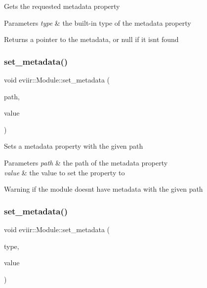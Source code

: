 Gets the requested metadata property 
\begin{DoxyParams}{Parameters}
{\em type} & the built-\/in type of the metadata property \\
\hline
\end{DoxyParams}
\begin{DoxyReturn}{Returns}
a pointer to the metadata, or null if it isn\textquotesingle{}t found 
\end{DoxyReturn}
\mbox{\label{classeviir_1_1Module_ad074a2b8807d4d4e2aeefa4c09756a07}} 
\subsubsection{\texorpdfstring{set\+\_\+metadata()}{set\_metadata()}\hspace{0.1cm}{\footnotesize\ttfamily [1/2]}}
{\footnotesize\ttfamily void eviir\+::\+Module\+::set\+\_\+metadata (\begin{DoxyParamCaption}\item[{\hyperlink{classeviir_1_1Metadata_ac613e5de0552301f9b7969d14eb5dffa}{Metadata\+::path}}]{path,  }\item[{\hyperlink{classeviir_1_1Value}{Value} $\ast$}]{value }\end{DoxyParamCaption})}

Sets a metadata property with the given path 
\begin{DoxyParams}{Parameters}
{\em path} & the path of the metadata property \\
\hline
{\em value} & the value to set the property to \\
\hline
\end{DoxyParams}
\begin{DoxyWarning}{Warning}
if the module doesn\textquotesingle{}t have metadata with the given path 
\end{DoxyWarning}
\mbox{\label{classeviir_1_1Module_a595290ae9c03680340e20ba068f845de}} 
\subsubsection{\texorpdfstring{set\+\_\+metadata()}{set\_metadata()}\hspace{0.1cm}{\footnotesize\ttfamily [2/2]}}
{\footnotesize\ttfamily void eviir\+::\+Module\+::set\+\_\+metadata (\begin{DoxyParamCaption}\item[{\hyperlink{classeviir_1_1Metadata_a372fe4af91ebc18a6d02354e8bcf23cf}{Metadata\+::builtin\+\_\+property\+\_\+type}}]{type,  }\item[{\hyperlink{classeviir_1_1Value}{Value} $\ast$}]{value }\end{DoxyParamCaption})}

